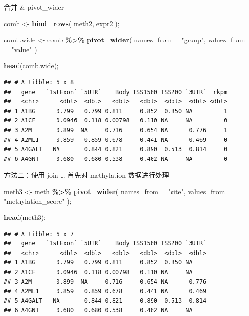 \documentclass[ignorenonframetext,]{beamer}
\newenvironment{Shaded}{\begin{snugshade}}{\end{snugshade}}
\newcommand{\AttributeTok}[1]{\textcolor[rgb]{0.13,0.29,0.53}{#1}}
\newcommand{\FunctionTok}[1]{\textcolor[rgb]{0.13,0.29,0.53}{\textbf{#1}}}
\newcommand{\NormalTok}[1]{#1}
\newcommand{\OtherTok}[1]{\textcolor[rgb]{0.56,0.35,0.01}{#1}}
\newcommand{\SpecialCharTok}[1]{\textcolor[rgb]{0.81,0.36,0.00}{\textbf{#1}}}
\newcommand{\StringTok}[1]{\textcolor[rgb]{0.31,0.60,0.02}{#1}}
\newcommand\FontSmall{\fontsize{7}{8}\selectfont}
\begin{document}
\begin{frame}[fragile]{合并 \& pivot\_wider}
\protect\hypertarget{ux5408ux5e76-pivot_wider}{}
\FontSmall

\begin{Shaded}
\begin{Highlighting}[]
\NormalTok{comb }\OtherTok{\textless{}{-}} \FunctionTok{bind\_rows}\NormalTok{( meth2, expr2 );}

\NormalTok{comb.wide }\OtherTok{\textless{}{-}}\NormalTok{ comb }\SpecialCharTok{\%\textgreater{}\%} \FunctionTok{pivot\_wider}\NormalTok{( }\AttributeTok{names\_from =} \StringTok{"group"}\NormalTok{, }\AttributeTok{values\_from =} \StringTok{"value"}\NormalTok{ );}

\FunctionTok{head}\NormalTok{(comb.wide);}
\end{Highlighting}
\end{Shaded}

\begin{verbatim}
## # A tibble: 6 x 8
##   gene   `1stExon` `5UTR`    Body TSS1500 TSS200 `3UTR`  rkpm
##   <chr>      <dbl>  <dbl>   <dbl>   <dbl>  <dbl>  <dbl> <dbl>
## 1 A1BG      0.799   0.799 0.811     0.852  0.850 NA         1
## 2 A1CF      0.0946  0.118 0.00798   0.110 NA     NA         0
## 3 A2M       0.899  NA     0.716     0.654 NA      0.776     1
## 4 A2ML1     0.859   0.859 0.678     0.441 NA      0.469     0
## 5 A4GALT   NA       0.844 0.821     0.890  0.513  0.814     0
## 6 A4GNT     0.680   0.680 0.538     0.402 NA     NA         0
\end{verbatim}
\end{frame}

\begin{frame}[fragile]{方法二：使用 join \ldots{}}
\protect\hypertarget{ux65b9ux6cd5ux4e8cux4f7fux7528-join}{}
首先对 methylation 数据进行处理

\FontSmall

\begin{Shaded}
\begin{Highlighting}[]
\NormalTok{meth3 }\OtherTok{\textless{}{-}} 
\NormalTok{  meth }\SpecialCharTok{\%\textgreater{}\%} \FunctionTok{pivot\_wider}\NormalTok{( }\AttributeTok{names\_from =}  \StringTok{"site"}\NormalTok{, }\AttributeTok{values\_from =} \StringTok{"methylation\_score"}\NormalTok{ );}

\FunctionTok{head}\NormalTok{(meth3);}
\end{Highlighting}
\end{Shaded}

\begin{verbatim}
## # A tibble: 6 x 7
##   gene   `1stExon` `5UTR`    Body TSS1500 TSS200 `3UTR`
##   <chr>      <dbl>  <dbl>   <dbl>   <dbl>  <dbl>  <dbl>
## 1 A1BG      0.799   0.799 0.811     0.852  0.850 NA    
## 2 A1CF      0.0946  0.118 0.00798   0.110 NA     NA    
## 3 A2M       0.899  NA     0.716     0.654 NA      0.776
## 4 A2ML1     0.859   0.859 0.678     0.441 NA      0.469
## 5 A4GALT   NA       0.844 0.821     0.890  0.513  0.814
## 6 A4GNT     0.680   0.680 0.538     0.402 NA     NA
\end{verbatim}
\end{frame}
\end{document}
